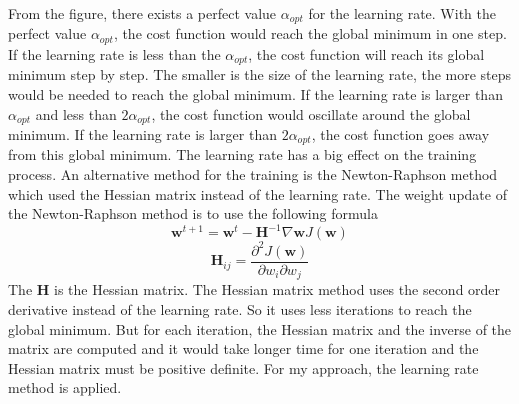 From the figure, there exists a perfect value $\alpha_{opt}$ for the learning rate. With the perfect value $\alpha_{opt}$, the cost function would reach the global minimum in one step. If 
 the learning rate is less than the $\alpha_{opt}$, the cost function will reach its global minimum step by step. The smaller is the size of the learning rate, the more steps would be needed to reach the global minimum. If the learning rate is larger than $\alpha_{opt}$ and less than $2\alpha_{opt}$, the cost function would oscillate around the global minimum. If the learning rate is larger than $2\alpha_{opt}$, the cost function goes away from this global minimum. The learning rate has a big effect on the training process. An alternative method for the training is the Newton-Raphson method which used the Hessian matrix instead of the learning rate.
The weight update of the Newton-Raphson method is to use the following formula
\begin{equation}
{\textbf{w}}^{t+1}={\textbf{w}}^{t}-{\textbf{H}}^{-1} \nabla {\textbf{w}} J(\textbf{w})
\end{equation}
\begin{equation}
\textbf{H}_{ij} = \frac{\partial^2 J(\textbf{w})}{\partial w_i \partial w_j} 
\end{equation}
The $\textbf{H}$ is the Hessian matrix. The Hessian matrix method uses the second order derivative instead of the learning rate. So it  uses less iterations to reach the global minimum. But for each iteration, the Hessian matrix and the inverse of the matrix  are computed and it would take longer time for one iteration and the Hessian matrix must be positive definite. For my approach, the learning rate method is applied. 

